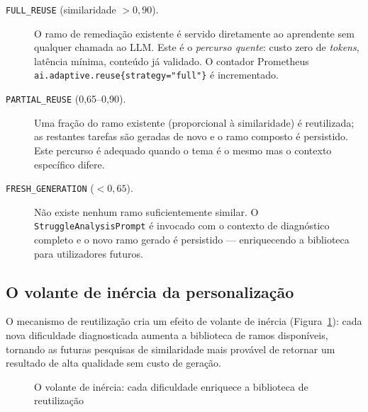 \begin{description}
  \item[\texttt{FULL\_REUSE} (similaridade $> 0{,}90$).]
    O ramo de remediação existente é servido diretamente ao aprendente
    sem qualquer chamada ao LLM.
    Este é o \emph{percurso quente}: custo zero de \textit{tokens},
    latência mínima, conteúdo já validado.
    O contador Prometheus
    \texttt{ai.adaptive.reuse\{strategy="full"\}} é incrementado.

  \item[\texttt{PARTIAL\_REUSE} (0{,}65–0{,}90).]
    Uma fração do ramo existente (proporcional à similaridade) é reutilizada;
    as restantes tarefas são geradas de novo e o ramo composto é persistido.
    Este percurso é adequado quando o tema é o mesmo mas o contexto
    específico difere.

  \item[\texttt{FRESH\_GENERATION} ($< 0{,}65$).]
    Não existe nenhum ramo suficientemente similar.
    O \texttt{StruggleAnalysisPrompt} é invocado com o contexto de
    diagnóstico completo e o novo ramo gerado é persistido — enriquecendo
    a biblioteca para utilizadores futuros.
\end{description}

\subsection*{O volante de inércia da personalização}

O mecanismo de reutilização cria um efeito de volante de inércia
(Figura~\ref{fig:flywheel}): cada nova dificuldade diagnosticada
aumenta a biblioteca de ramos disponíveis, tornando as futuras pesquisas
de similaridade mais provável de retornar um resultado de alta qualidade
sem custo de geração.

\begin{figure}[htbp]
  \centering
  \caption{O volante de inércia: cada dificuldade enriquece a biblioteca de reutilização}
  \label{fig:flywheel}
\end{figure}


